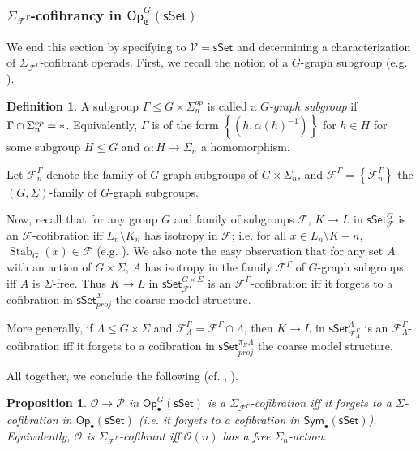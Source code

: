 \documentclass[a4paper,10pt
,draft
]{article}%
\numberwithin{equation}{section}
\numberwithin{figure}{section}
\newtheorem{proposition}[equation]{Proposition}%
\theoremstyle{definition} %
\newtheorem{definition}[equation]{Definition}%
\newcommand{\set}[1]{\left\{#1\right\}}%
\newcommand{\Sym}{\ensuremath{\mathsf{Sym}}}%
\newcommand{\sSet}{\ensuremath{\mathsf{sSet}}}%
\newcommand{\Op}{\mathsf{Op}}%
\DeclareMathOperator{\Stab}{Stab}
\newcommand{\F}{\ensuremath{\mathcal F}}
\newcommand{\V}{\ensuremath{\mathcal V}}
\renewcommand{\O}{\ensuremath{\mathcal O}}
\renewcommand{\P}{\ensuremath{\mathcal P}}
\newcommand{\1}{\ensuremath{\mathbbm 1}}%
\begin{document}



\subsubsection*{$\Sigma_{\F^{\Gamma}}$-cofibrancy in $\Op^G_{\mathfrak C}(\sSet)$}

We end this section by specifying to $\V = \sSet$ and determining a characterization of $\Sigma_{\F^\Gamma}$-cofibrant operads.
First, we recall the notion of a $G$-graph subgroup (e.g. \cite[Defn. 6.34]{BP_geo}).
\begin{definition}
      \label{GRAPHSUB_DEF}
      A subgroup $\Gamma \leq G \times \Sigma_n^{op}$ is called a \textit{$G$-graph subgroup} if
      $\Gamma \cap \Sigma_n^{op} = \**$.
      Equivalently, $\Gamma$ is of the form $\set{(h, \alpha(h)^{-1})}$ for $h \in H$ for some subgroup $H \leq G$ and $\alpha \colon H \to \Sigma_n$ a homomorphism.

      Let $\F_n^\Gamma$ denote the family of $G$-graph subgroups of $G \times \Sigma_n$, and $\F^\Gamma = \set{\F_n^{\Gamma}}$ the $(G,\Sigma)$-family of $G$-graph subgroups.
\end{definition}

Now, recall that for any group $G$ and family of subgroups $\F$,
$K \to L$ in $\sSet^{G}_\F$ is an $\F$-cofibration iff $L_n \setminus K_n$ has isotropy in $\F$; i.e. for all $x \in L_n \setminus K-n$, $\Stab_{G}(x) \in \F$ (e.g. \cite[Prop. 2.16]{Ste16}).
% 
We also note the easy observation that for any set $A$ with an action of $G \times \Sigma$,
$A$ has isotropy in the family $\F^\Gamma$ of $G$-graph subgroups
iff
$A$ is $\Sigma$-free.
% 
Thus $K \to L$ in $\sSet^{G \times \Sigma}_{\F^\Gamma}$ is an $\F^\Gamma$-cofibration
iff
it forgets to a cofibration in $\sSet^\Sigma_{proj}$ the coarse model structure.

More generally, if $\Lambda \leq G \times \Sigma$ and $\F^\Gamma_{\Lambda} = \F^\Gamma \cap \Lambda$,
then $K \to L$ in $\sSet^{\Lambda}_{\F^\Gamma_\Lambda}$ is an $\F^\Gamma_\Lambda$-cofibration
iff
it forgets to a cofibration in $\sSet^{\pi_{\Sigma}\Lambda}_{proj}$ the coarse model structure.
      
All together, we conclude the following (cf. \cite[Remark 6.7]{Per18}, \cite[discussion before Thm. 2.31]{BP_edss}).

\begin{proposition}
      \label{SGS_COF_PROP}
      $\O \to \P$ in $\Op_\bullet^G(\sSet)$ is a $\Sigma_{\F^\Gamma}$-cofibration iff
      it forgets to a $\Sigma$-cofibration in $\Op_\bullet(\sSet)$
      (i.e. it forgets to a cofibration in $\Sym_\bullet(\sSet)$).
      Equivalently, $\O$ is $\Sigma_{\F^\Gamma}$-cofibrant iff $\O(n)$ has a free $\Sigma_n$-action.
\end{proposition}
\end{document}
